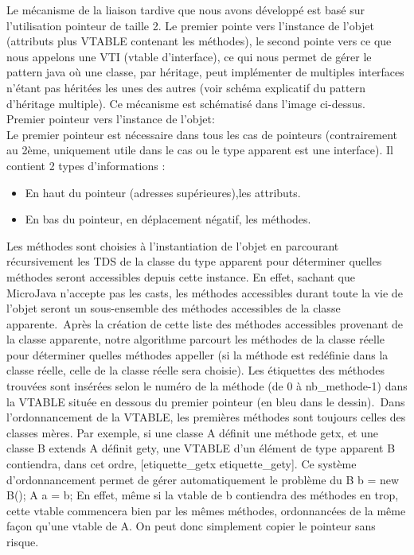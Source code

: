 
Le mécanisme de la liaison tardive que nous avons développé est basé sur l'utilisation
pointeur de taille 2. Le premier pointe vers l'instance de l'objet (attributs
plus VTABLE contenant les méthodes), le second pointe vers ce que nous appelons
une VTI (vtable d'interface), ce qui nous permet de gérer le pattern java où une
classe, par héritage, peut implémenter de multiples interfaces n'étant pas
héritées les unes des autres (voir schéma explicatif du pattern d'héritage
multiple). Ce mécanisme est schématisé dans l'image ci-dessus.\\

Premier pointeur vers l'instance de l'objet:\\
Le premier pointeur est nécessaire dans tous les cas de pointeurs (contrairement
au 2ème, uniquement utile dans le cas ou le type apparent est une interface). Il
contient 2 types d'informations :

\begin{itemize}
	\item En haut du pointeur (adresses supérieures),les attributs.
	\item En bas du pointeur, en déplacement négatif, les méthodes.

\end{itemize}

Les méthodes sont choisies à l'instantiation de l'objet en parcourant récursivement
les TDS de la classe du type apparent pour déterminer quelles méthodes seront
accessibles depuis cette instance. En effet, sachant que MicroJava n'accepte pas
les casts, les méthodes accessibles durant toute la vie de l'objet seront un
sous-ensemble des méthodes accessibles de la classe apparente.\
Après la création de cette liste des méthodes accessibles provenant de la classe apparente, notre
algorithme parcourt les méthodes de la classe réelle pour déterminer quelles
méthodes appeller (si la méthode est redéfinie dans la classe réelle, celle de
la classe réelle sera choisie). Les étiquettes des méthodes trouvées sont
insérées selon le numéro de la méthode (de 0 à nb\_methode-1) dans la VTABLE
située en dessous du premier pointeur (en bleu dans le dessin).\
Dans l'ordonnancement de la VTABLE, les premières méthodes sont toujours celles
des classes mères. Par exemple, si une classe A définit une méthode getx, et une
classe B extends A définit gety, une VTABLE d'un élément de type apparent B
contiendra, dans cet ordre, [etiquette\_getx etiquette\_gety]. Ce système
d'ordonnancement permet de gérer automatiquement le problème du B b = new B(); A
a = b; En effet, même si la vtable de b contiendra des méthodes en trop, cette
vtable commencera bien par les mêmes méthodes, ordonnancées de la même façon
qu'une vtable de A. On peut donc simplement copier le pointeur sans risque.\\


